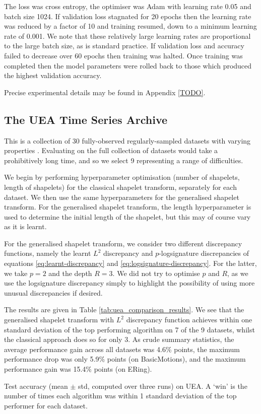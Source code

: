 \documentclass{article}
\theoremstyle{plain}
\theoremstyle{definition}
\begin{document}
The loss was cross entropy, the optimiser was Adam \cite{kingma2015} with learning rate 0.05 and batch size 1024. If validation loss stagnated for 20 epochs then the learning rate was reduced by a factor of 10 and training resumed, down to a minimum learning rate of 0.001. We note that these relatively large learning rates are proportional to the large batch size, as is standard practice. If validation loss and accuracy failed to decrease over 60 epochs then training was halted. Once training was completed then the model parameters were rolled back to those which produced the highest validation accuracy.

Precise experimental details may be found in Appendix \ref{TODO}.

\subsection{The UEA Time Series Archive}
This is a collection of 30 fully-observed regularly-sampled datasets with varying properties \cite{bagnall2018uea}. Evaluating on the full collection of datasets would take a prohibitively long time, and so we select 9 representing a range of difficulties.

We begin by performing hyperparameter optimisation (number of shapelets, length of shapelets) for the classical shapelet transform, separately for each dataset. We then use the same hyperparameters for the generalised shapelet transform. For the generalised shapelet transform, the length hyperparameter is used to determine the initial length of the shapelet, but this may of course vary as it is learnt.

For the generalised shapelet transform, we consider two different discrepancy functions, namely the learnt $L^2$ discrepancy and $p$-logsignature discrepancies of equations \eqref{eq:learnt-discrepancy} and \eqref{eq:logsignature-discrepancy}. For the latter, we take $p=2$ and the depth $R=3$. We did not try to optimise $p$ and $R$, as we use the logsignature discrepancy simply to highlight the possibility of using more unusual discrepancies if desired.

The results are given in Table \ref{tab:uea_comparison_results}. We see that the generalised shapelet transform with $L^2$ discrepancy function achieves within one standard deviation of the top performing algorithm on 7 of the 9 datasets, whilst the classical approach does so for only 3. As crude summary statistics, the average performance gain across all datasets was 4.6\% points, the maximum performance drop was only 5.9\% points (on BasicMotions), and the maximum performance gain was 15.4\% points (on ERing).
\begin{table}[t]
    \centering
    \caption{Test accuracy (mean $\pm$ std, computed over three runs) on UEA. A `win' is the number of times each algorithm was within 1 standard deviation of the top performer for each dataset.}
    \label{tab:uea_comparison_results}
    
\end{table}
\end{document}
